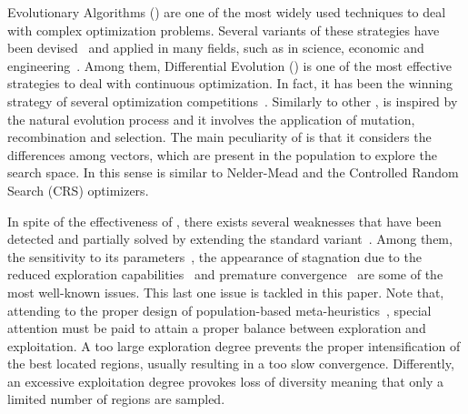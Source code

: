 Evolutionary Algorithms (\EAS{}) are one of the most widely used techniques to deal with complex optimization problems.
%
Several variants of these strategies have been devised~\cite{Talbi:09} and applied in many fields, such as in science, 
economic and engineering~\cite{chakraborty2008advances}.
%
Among them, Differential Evolution (\DE{}) \cite{storn1997differential} is one of the most effective strategies to deal
with continuous optimization.
%
In fact, it has been the winning strategy of several optimization competitions~\cite{das2011differential}.
%
Similarly to other \EAS{}, \DE{} is inspired by the natural evolution process and it involves the application of mutation, recombination and 
selection.
%
The main peculiarity of \DE{} is that it considers the differences among vectors, which are present in the population to explore the search space.
%
In this sense is similar to Nelder-Mead \cite{nelder1965simplex} and the 
Controlled Random Search (CRS) \cite{price1983global} optimizers.

In spite of the effectiveness of \DE{}, there exists several weaknesses that have been detected and partially
solved by extending the standard variant~\cite{das2011differential}.
%
Among them, the sensitivity to its parameters~\cite{zhang2009jade}, the appearance of stagnation due to the reduced exploration 
capabilities~\cite{sa2008exploration,lampinen2000stagnation} and premature convergence~\cite{zaharie2003control} are some of the most well-known
issues.
%
This last one issue is tackled in this paper.
%
Note that, attending to the proper design of population-based meta-heuristics~\cite{Talbi:09}, special attention must be
paid to attain a proper balance between exploration and exploitation.
%
A too large exploration degree prevents the proper intensification of the best located regions, usually resulting in a
too slow convergence.
%
Differently, an excessive exploitation degree provokes loss of diversity meaning that only a limited number of regions are sampled.

